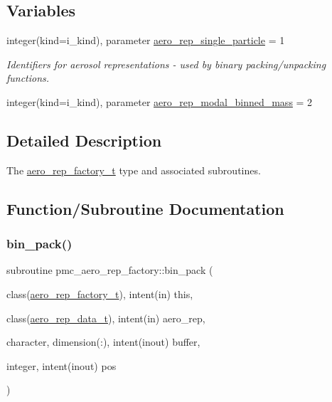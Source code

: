 \subsection*{Variables}
\begin{DoxyCompactItemize}
\item 
integer(kind=i\+\_\+kind), parameter \mbox{\hyperlink{namespacepmc__aero__rep__factory_aa1580bb537129ddd255b271666133c84}{aero\+\_\+rep\+\_\+single\+\_\+particle}} = 1
\begin{DoxyCompactList}\small\item\em Identifiers for aerosol representations -\/ used by binary packing/unpacking functions. \end{DoxyCompactList}\item 
integer(kind=i\+\_\+kind), parameter \mbox{\hyperlink{namespacepmc__aero__rep__factory_a26fa93012c30cd32b47383811765e08b}{aero\+\_\+rep\+\_\+modal\+\_\+binned\+\_\+mass}} = 2
\end{DoxyCompactItemize}


\subsection{Detailed Description}
The \mbox{\hyperlink{structpmc__aero__rep__factory_1_1aero__rep__factory__t}{aero\+\_\+rep\+\_\+factory\+\_\+t}} type and associated subroutines. 

\subsection{Function/\+Subroutine Documentation}
\mbox{\label{namespacepmc__aero__rep__factory_a02df230770bd6e28c72b368d4d824788}} 
\subsubsection{\texorpdfstring{bin\+\_\+pack()}{bin\_pack()}}
{\footnotesize\ttfamily subroutine pmc\+\_\+aero\+\_\+rep\+\_\+factory\+::bin\+\_\+pack (\begin{DoxyParamCaption}\item[{class(\mbox{\hyperlink{structpmc__aero__rep__factory_1_1aero__rep__factory__t}{aero\+\_\+rep\+\_\+factory\+\_\+t}}), intent(in)}]{this,  }\item[{class(\mbox{\hyperlink{structpmc__aero__rep__data_1_1aero__rep__data__t}{aero\+\_\+rep\+\_\+data\+\_\+t}}), intent(in)}]{aero\+\_\+rep,  }\item[{character, dimension(\+:), intent(inout)}]{buffer,  }\item[{integer, intent(inout)}]{pos }\end{DoxyParamCaption})\hspace{0.3cm}{\ttfamily [private]}}



